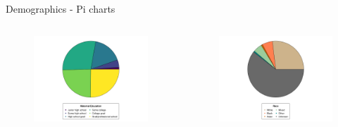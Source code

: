 
\begin{frame}{Demographics - Pi charts}
    \begin{columns}[c] %

    
        \begin{figure}
        \includegraphics[width=1\linewidth]{../figures/demo_education.png}
        \end{figure}

    
        \begin{figure}
        \includegraphics[width=1\linewidth]{../figures/demo_race.png}
        \end{figure}


\end{columns}
\end{frame}
